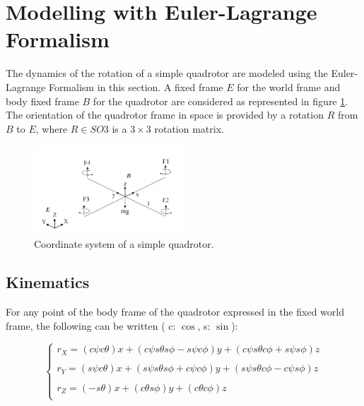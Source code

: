 \documentclass{thesisreport}
\begin{document}
\newpage 

 \section{Modelling with Euler-Lagrange Formalism} 
 The dynamics of the rotation of a simple quadrotor are modeled using the Euler-Lagrange Formalism in this section. A fixed frame $E$ for the world frame and body fixed frame $B$ for the quadrotor are considered as represented in figure \ref{coordinate_system_simple}. The orientation of the quadrotor frame in space is provided by a rotation $R$ from $B$ to $E$, where $R\in SO3$ is a $3 \times 3 $ rotation matrix.
 
 
 \begin{figure}[h]
 \centering
 \includegraphics[width=0.5\textwidth]{Images/Modeling/Test_Bench}
 \caption{Coordinate system of a simple quadrotor. \cite{Bouabdalla2007}}
 \label{coordinate_system_simple}
 \end{figure}

\subsection{Kinematics} 
 
 For any point of the body frame of the quadrotor expressed in the fixed world frame, the following can be written 
 ( c: $\cos$, s: $\sin$):   
 
 \begin{equation}\label{kinematics}
 \begin{cases}
 r_X= (c\psi c \theta ) x + ( c \psi s \theta s \phi  - s \psi c \phi) y + (c \psi s \theta c \phi + s \psi s \phi) z \\
 \\
 r_Y= (s\psi c \theta ) x + ( s \psi s \theta s \phi  + c \psi c \phi) y + (s \psi s \theta c \phi - c \psi s \phi) z \\
 \\
 r_Z= (-s \theta ) x + ( c \theta s \phi ) y + (c \theta c \phi) z \\ 
 \end{cases}
 \end{equation}
\end{document}
